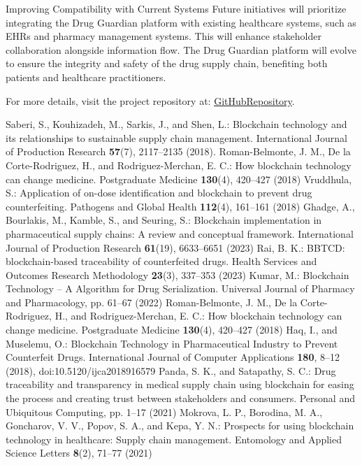 \documentclass[conference]{IEEEtran}
\begin{document}
Improving Compatibility with Current Systems Future initiatives will prioritize integrating the Drug Guardian platform with existing healthcare systems, such as EHRs and pharmacy management systems. This will enhance stakeholder collaboration alongside information flow.
The Drug Guardian platform will evolve to ensure the integrity and safety of the drug supply chain, benefiting both patients and healthcare practitioners.


For more details, visit the project repository at: \href{https://github.com/tanishka786/Drug_Blockchain.git}{GitHubRepository}.



\begin{thebibliography}{00}
Saberi, S., Kouhizadeh, M., Sarkis, J., and Shen, L.: Blockchain technology and its relationships to sustainable supply chain management. International Journal of Production Research \textbf{57}(7), 2117--2135 (2018). 
Roman-Belmonte, J. M., De la Corte-Rodriguez, H., and Rodriguez-Merchan, E. C.: 
How blockchain technology can change medicine. Postgraduate Medicine 
\textbf{130}(4), 420--427 (2018)
Vruddhula, S.: Application of on-dose identification and blockchain to prevent drug counterfeiting. 
Pathogens and Global Health \textbf{112}(4), 161--161 (2018)
Ghadge, A., Bourlakis, M., Kamble, S., and Seuring, S.: Blockchain implementation 
in pharmaceutical supply chains: A review and conceptual framework. 
International Journal of Production Research \textbf{61}(19), 6633--6651 (2023)
Rai, B. K.: BBTCD: blockchain-based traceability of counterfeited drugs. 
Health Services and Outcomes Research Methodology \textbf{23}(3), 337--353 (2023)
Kumar, M.: Blockchain Technology – A Algorithm for Drug Serialization. 
Universal Journal of Pharmacy and Pharmacology, pp. 61--67 (2022)
Roman-Belmonte, J. M., De la Corte-Rodriguez, H., and Rodriguez-Merchan, E. C.: 
How blockchain technology can change medicine. Postgraduate Medicine 
\textbf{130}(4), 420--427 (2018)
Haq, I., and Muselemu, O.: Blockchain Technology in Pharmaceutical Industry to Prevent Counterfeit Drugs. 
International Journal of Computer Applications \textbf{180}, 8--12 (2018), 
doi:10.5120/ijca2018916579
Panda, S. K., and Satapathy, S. C.: Drug traceability and transparency in medical 
supply chain using blockchain for easing the process and creating trust between 
stakeholders and consumers. Personal and Ubiquitous Computing, pp. 1--17 (2021)
Mokrova, L. P., Borodina, M. A., Goncharov, V. V., Popov, S. A., and Kepa, Y. N.: 
Prospects for using blockchain technology in healthcare: Supply chain management. 
Entomology and Applied Science Letters \textbf{8}(2), 71--77 (2021)


\end{thebibliography}
\end{document}
